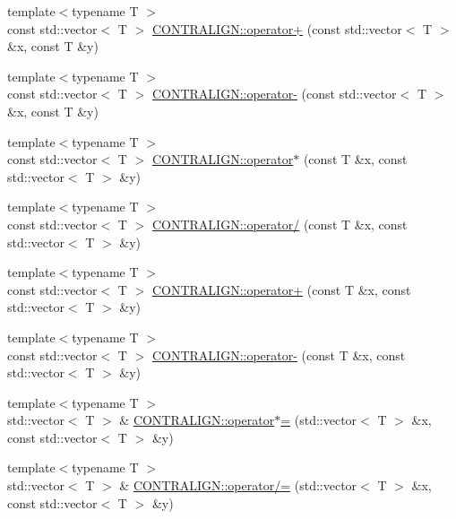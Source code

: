 \begin{DoxyCompactItemize}
\item 
{\footnotesize template$<$typename T $>$ }\\const std\+::vector$<$ T $>$ \hyperlink{namespace_c_o_n_t_r_a_l_i_g_n_ae2222d1e328d2c582c47a729bf9ebf42}{C\+O\+N\+T\+R\+A\+L\+I\+G\+N\+::operator+} (const std\+::vector$<$ T $>$ \&x, const T \&y)
\item 
{\footnotesize template$<$typename T $>$ }\\const std\+::vector$<$ T $>$ \hyperlink{namespace_c_o_n_t_r_a_l_i_g_n_a6999f279abf3d94291a284bc5b82546e}{C\+O\+N\+T\+R\+A\+L\+I\+G\+N\+::operator-\/} (const std\+::vector$<$ T $>$ \&x, const T \&y)
\item 
{\footnotesize template$<$typename T $>$ }\\const std\+::vector$<$ T $>$ \hyperlink{namespace_c_o_n_t_r_a_l_i_g_n_a8b40f9b1bc2302cfd81508683105dd4f}{C\+O\+N\+T\+R\+A\+L\+I\+G\+N\+::operator$\ast$} (const T \&x, const std\+::vector$<$ T $>$ \&y)
\item 
{\footnotesize template$<$typename T $>$ }\\const std\+::vector$<$ T $>$ \hyperlink{namespace_c_o_n_t_r_a_l_i_g_n_a514e32eb89504fc0d503a0350ff381cb}{C\+O\+N\+T\+R\+A\+L\+I\+G\+N\+::operator/} (const T \&x, const std\+::vector$<$ T $>$ \&y)
\item 
{\footnotesize template$<$typename T $>$ }\\const std\+::vector$<$ T $>$ \hyperlink{namespace_c_o_n_t_r_a_l_i_g_n_ac43e8f22ac47bc4ce841bfc8c3fd943a}{C\+O\+N\+T\+R\+A\+L\+I\+G\+N\+::operator+} (const T \&x, const std\+::vector$<$ T $>$ \&y)
\item 
{\footnotesize template$<$typename T $>$ }\\const std\+::vector$<$ T $>$ \hyperlink{namespace_c_o_n_t_r_a_l_i_g_n_abf9d5632e8a4feaa3d5b254ac83ccd03}{C\+O\+N\+T\+R\+A\+L\+I\+G\+N\+::operator-\/} (const T \&x, const std\+::vector$<$ T $>$ \&y)
\item 
{\footnotesize template$<$typename T $>$ }\\std\+::vector$<$ T $>$ \& \hyperlink{namespace_c_o_n_t_r_a_l_i_g_n_aafc1ce4aa4d97210186c358eec543740}{C\+O\+N\+T\+R\+A\+L\+I\+G\+N\+::operator$\ast$=} (std\+::vector$<$ T $>$ \&x, const std\+::vector$<$ T $>$ \&y)
\item 
{\footnotesize template$<$typename T $>$ }\\std\+::vector$<$ T $>$ \& \hyperlink{namespace_c_o_n_t_r_a_l_i_g_n_a0100c7e8af5633fb403d3cbeee1f0dce}{C\+O\+N\+T\+R\+A\+L\+I\+G\+N\+::operator/=} (std\+::vector$<$ T $>$ \&x, const std\+::vector$<$ T $>$ \&y)

\end{DoxyCompactItemize}
